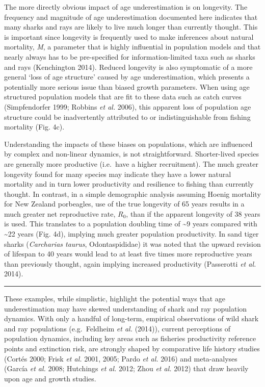 \documentclass[]{article}
\begin{document}
The more directly obvious impact of age underestimation is on longevity.
The frequency and magnitude of age underestimation documented here
indicates that many sharks and rays are likely to live much longer than
currently thought. This is important since longevity is frequently used
to make inferences about natural mortality, \emph{M}, a parameter that
is highly influential in population models and that nearly always has to
be pre-specified for information-limited taxa such as sharks and rays
(Kenchington 2014). Reduced longevity is also symptomatic of a more
general `loss of age structure' caused by age underestimation, which
presents a potentially more serious issue than biased growth parameters.
When using age structured population models that are fit to these data
such as catch curves (Simpfendorfer 1999; Robbins \emph{et al.} 2006),
this apparent loss of population age structure could be inadvertently
attributed to or indistinguishable from fishing mortality (Fig. 4c).

Understanding the impacts of these biases on populations, which are
influenced by complex and non-linear dynamics, is not straightforward.
Shorter-lived species are generally more productive (i.e.~have a higher
recruitment). The much greater longevity found for many species may
indicate they have a lower natural mortality and in turn lower
productivity and resilience to fishing than currently thought. In
contrast, in a simple demographic analysis assuming Hoenig mortality for
New Zealand porbeagles, use of the true longevity of 65 years results in
a much greater net reproductive rate, \(R_0\), than if the apparent
longevity of 38 years is used. This translates to a population doubling
time of \textasciitilde{}9 years compared with \textasciitilde{}22 years
(Fig. 4d), implying much greater population productivity. In sand tiger
sharks (\emph{Carcharias taurus}, Odontaspididae) it was noted that the
upward revision of lifespan to 40 years would lead to at least five
times more reproductive years than previously thought, again implying
increased productivity (Passerotti \emph{et al.} 2014).

\begin{center}
\noindent\rule{2cm}{0.4pt}
\end{center}

These examples, while simplistic, highlight the potential ways that age
underestimation may have skewed understanding of shark and ray
population dynamics. With only a handful of long-term, empirical
observations of wild shark and ray populations (e.g.~Feldheim \emph{et
al.} (2014)), current perceptions of population dynamics, including key
areas such as fisheries productivity reference points and extinction
risk, are strongly shaped by comparative life history studies (Cortés
2000; Frisk \emph{et al.} 2001, 2005; Pardo \emph{et al.} 2016) and
meta-analyses (García \emph{et al.} 2008; Hutchings \emph{et al.} 2012;
Zhou \emph{et al.} 2012) that draw heavily upon age and growth studies.
\end{document}
